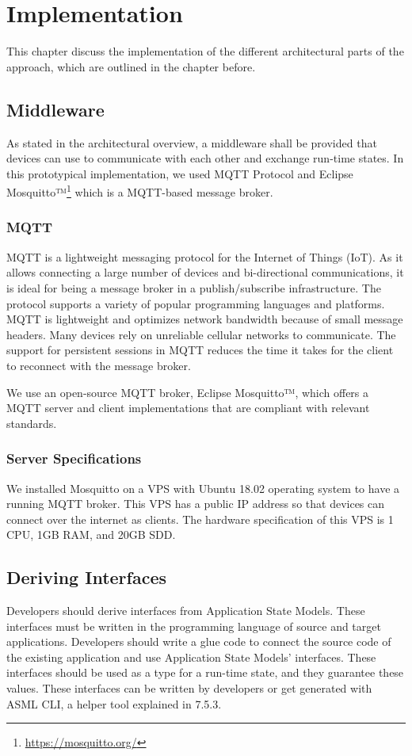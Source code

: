 \chapter{Implementation}
This chapter discuss the implementation of the different architectural parts of the approach, which are outlined in the chapter before.

\label{ch:implementation}
\section{Middleware}
As stated in the architectural overview, a middleware shall be provided that devices can use to communicate with each other and exchange run-time states. In this prototypical implementation, we used MQTT Protocol and Eclipse Mosquitto™\footnote{\url{https://mosquitto.org/}} which is a MQTT-based message broker.

\subsection{MQTT}
MQTT is a lightweight messaging protocol for the Internet of Things (IoT). As it allows connecting a large number of devices and bi-directional communications, it is ideal for being a message broker in a publish/subscribe infrastructure. The protocol supports a variety of popular programming languages and platforms\cite{mqtt}. MQTT is lightweight and optimizes network bandwidth because of small message headers. Many devices rely on unreliable cellular networks to communicate. The support for persistent sessions in MQTT reduces the time it takes for the client to reconnect with the message broker.

We use an open-source MQTT broker, Eclipse Mosquitto™, which offers a MQTT server and client implementations that are compliant with relevant standards.
\cite{mosquitto}

\subsection{Server Specifications}
We installed Mosquitto on a VPS with Ubuntu 18.02 operating system to have a running MQTT broker. This VPS has a public IP address so that devices can connect over the internet as clients. The hardware specification of this VPS is 1 CPU, 1GB RAM, and 20GB SDD. 

\section{Deriving Interfaces}
Developers should derive interfaces from Application State Models. These interfaces must be written in the programming language of source and target applications. Developers should write a glue code to connect the source code of the existing application and use Application State Models' interfaces. These interfaces should be used as a type for a run-time state, and they guarantee these values. These interfaces can be written by developers or get generated with ASML CLI, a helper tool explained in 7.5.3.

